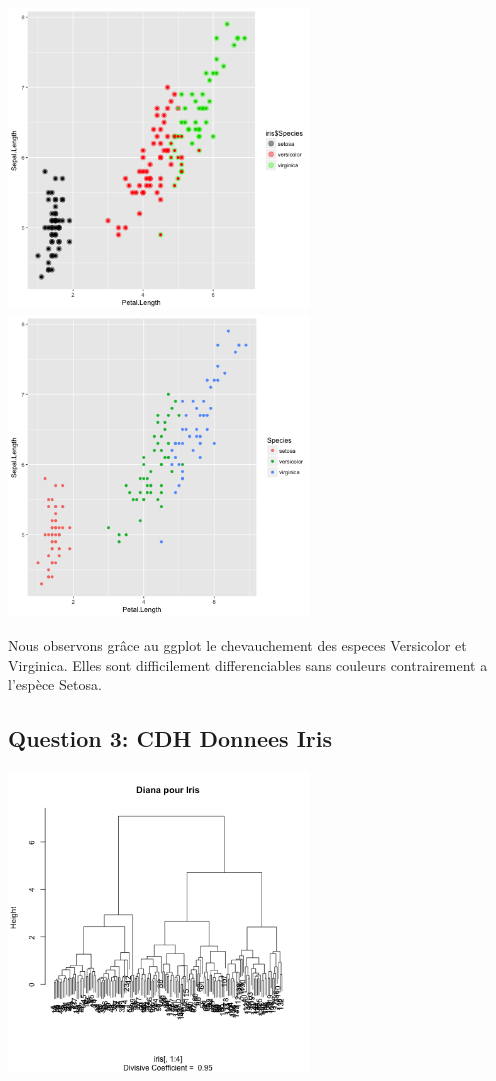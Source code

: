 \documentclass[10pt]{article}
\begin{document}
	\includegraphics[height = 8cm, width = 8cm]{Figures/HClust/ggplot_Iris_ward.png}
	\label{fig:iris_ward_ggplot}
	\includegraphics[height = 8cm, width = 8cm]{Figures/HClust/ggplot_Iris_normal.png}
	\label{fig:iris_normal_ggplot}
	
	Nous observons grâce au ggplot le chevauchement des especes Versicolor et Virginica. Elles sont difficilement differenciables sans couleurs contrairement a l'espèce Setosa.
	
	\subsection{Question 3:  CDH Donnees Iris}
	
	\includegraphics[height = 8cm, width = 8cm]{Figures/HClust/diana_Iris.png}
	\label{fig:iris_diana}
	
\end{document}
